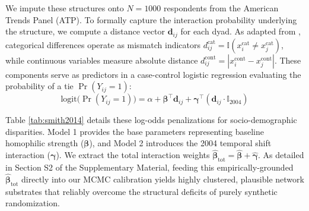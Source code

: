 \documentclass[5p,twocolumn,authoryear]{elsarticle}
\begin{document}
We impute these structures onto $N=1000$ respondents from the American Trends Panel (ATP). To formally capture the interaction probability underlying the structure, we compute a distance vector $\mathbf{d}_{ij}$ for each dyad. As adapted from \citet{smith2014}, categorical differences operate as mismatch indicators $d^{\mathrm{cat}}_{ij} = \mathbb{I}(x^{\mathrm{cat}}_i \neq x^{\mathrm{cat}}_j)$, while continuous variables measure absolute distance $d^{\mathrm{cont}}_{ij} = |x^{\mathrm{cont}}_i - x^{\mathrm{cont}}_j|$. These components serve as predictors in a case-control logistic regression evaluating the probability of a tie $\Pr(Y_{ij}=1)$:
\begin{equation}
    \text{logit}\big(\Pr(Y_{ij}=1)\big) = \alpha + \boldsymbol{\beta}^\top \mathbf{d}_{ij} + \boldsymbol{\gamma}^\top (\mathbf{d}_{ij} \cdot \mathbb{I}_{2004})
\end{equation}

Table \ref{tab:smith2014} details these log-odds penalizations for socio-demographic disparities. Model 1 provides the base parameters representing baseline homophilic strength ($\boldsymbol{\beta}$), and Model 2 introduces the 2004 temporal shift interaction ($\boldsymbol{\gamma}$). We extract the total interaction weights $\hat{\boldsymbol{\beta}}_{\text{tot}} = \hat{\boldsymbol{\beta}} + \hat{\boldsymbol{\gamma}}$. As detailed in Section S2 of the Supplementary Material, feeding this empirically-grounded $\hat{\boldsymbol{\beta}}_{\text{tot}}$ directly into our MCMC calibration yields highly clustered, plausible network substrates that reliably overcome the structural deficits of purely synthetic randomization.
\end{document}
